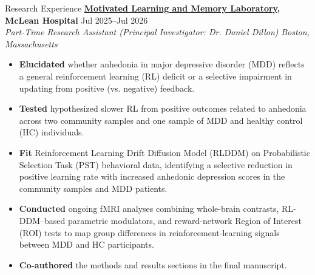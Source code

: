 \documentclass{resume} %
\begin{document}
\begin{rSection}{Research Experience}
\textbf{\href{https://cdasr.mclean.harvard.edu/mlml/}{Motivated Learning and Memory Laboratory}, McLean Hospital} \hfill{Jul 2025--Jul 2026} \\
\textit{Part-Time Research Assistant (Principal Investigator: Dr. Daniel Dillon)} \hfill{\textit{Boston, Massachusetts}}
 \begin{itemize}
    \itemsep -5pt {} 
     \item \textbf{Elucidated} whether anhedonia in major depressive disorder (MDD) reflects a general reinforcement learning (RL) deficit or a selective impairment in updating from positive (vs. negative) feedback.
     \item \textbf{Tested} hypothesized slower RL from positive outcomes related to anhedonia across two community samples and one sample of MDD and healthy control (HC) individuals. 
     \item \textbf{Fit} Reinforcement Learning Drift Diffusion Model (RLDDM) on Probabilistic Selection Task (PST) behavioral data, identifying a selective reduction in positive learning rate with increased anhedonic depression scores in the community samples and MDD patients. 
     \item \textbf{Conducted} ongoing fMRI analyses combining whole-brain contrasts, RL-DDM–based parametric modulators, and reward-network Region of Interest (ROI) tests to map group differences in reinforcement-learning signals between MDD and HC participants. 
     \item \textbf{Co-authored} the methods and results sections in the final manuscript. 
 \end{itemize}


\end{rSection}
\end{document}
